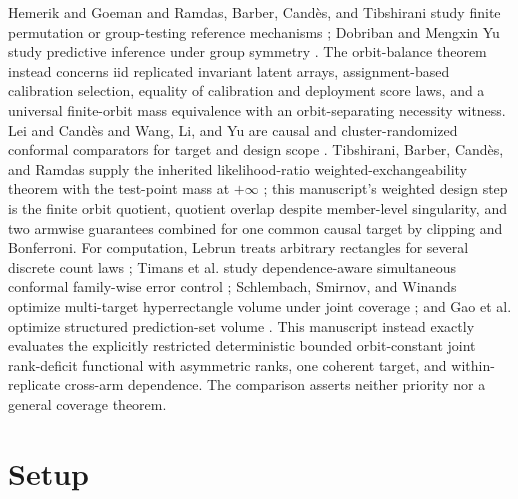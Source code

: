 \documentclass{article}
\begin{document}
Hemerik and Goeman and Ramdas, Barber, Candès, and Tibshirani study finite permutation or group-testing reference mechanisms \cite{HemerikGoeman2018,RamdasBarberCandesTibshirani2023}; Dobriban and Mengxin Yu study predictive inference under group symmetry \cite{DobribanYu2025}. The orbit-balance theorem instead concerns iid replicated invariant latent arrays, assignment-based calibration selection, equality of calibration and deployment score laws, and a universal finite-orbit mass equivalence with an orbit-separating necessity witness. Lei and Candès and Wang, Li, and Yu are causal and cluster-randomized conformal comparators for target and design scope \cite{LeiCandes2021,WangLiYu2025}. Tibshirani, Barber, Candès, and Ramdas supply the inherited likelihood-ratio weighted-exchangeability theorem with the test-point mass at \(+\infty\) \cite{TibshiraniBarberCandesRamdas2019}; this manuscript's weighted design step is the finite orbit quotient, quotient overlap despite member-level singularity, and two armwise guarantees combined for one common causal target by clipping and Bonferroni. For computation, Lebrun treats arbitrary rectangles for several discrete count laws \cite{Lebrun2013}; Timans et al. study dependence-aware simultaneous conformal family-wise error control \cite{TimansEtAl2025}; Schlembach, Smirnov, and Winands optimize multi-target hyperrectangle volume under joint coverage \cite{SchlembachSmirnovWinands2025}; and Gao et al. optimize structured prediction-set volume \cite{GaoShanSrinivasVijayaraghavan2025}. This manuscript instead exactly evaluates the explicitly restricted deterministic bounded orbit-constant joint rank-deficit functional with asymmetric ranks, one coherent target, and within-replicate cross-arm dependence. The comparison asserts neither priority nor a general coverage theorem.

\section{Setup}
\end{document}
